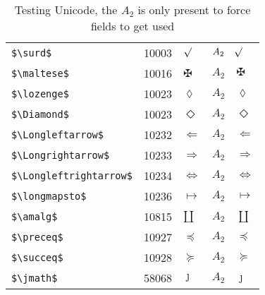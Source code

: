 \documentclass{article}
\begin{document}
\begin{table}
\begin{center}
\begin{tabular}{llll}
 \verb#$\surd$#               & 10003   & $\surd$               & $A_2\quad \surd$\\
 \verb#$\maltese$#            & 10016   & $\maltese$            & $A_2\quad \maltese$\\
 \verb#$\lozenge$#            & 10023   & $\lozenge$            & $A_2\quad \lozenge$\\
 \verb#$\Diamond$#            & 10023   & $\Diamond$            & $A_2\quad \Diamond$\\
 \verb#$\Longleftarrow$#      & 10232   & $\Longleftarrow$      & $A_2\quad \Longleftarrow$\\
 \verb#$\Longrightarrow$#     & 10233   & $\Longrightarrow$     & $A_2\quad \Longrightarrow$\\
 \verb#$\Longleftrightarrow$# & 10234   & $\Longleftrightarrow$ & $A_2\quad \Longleftrightarrow$\\
 \verb#$\longmapsto$#         & 10236   & $\longmapsto$         & $A_2\quad \longmapsto$\\
 \verb#$\amalg$#              & 10815   & $\amalg$              & $A_2\quad \amalg$\\
 \verb#$\preceq$#             & 10927   & $\preceq$             & $A_2\quad \preceq$\\
 \verb#$\succeq$#             & 10928   & $\succeq$             & $A_2\quad \succeq$\\
 \verb#$\jmath$#              & 58068   & $\jmath$              & $A_2\quad \jmath$\\
\end{tabular}
\end{center}
\caption{Testing Unicode, the $A_2$ is only present to force fields to get used}
\end{table}
\end{document}
